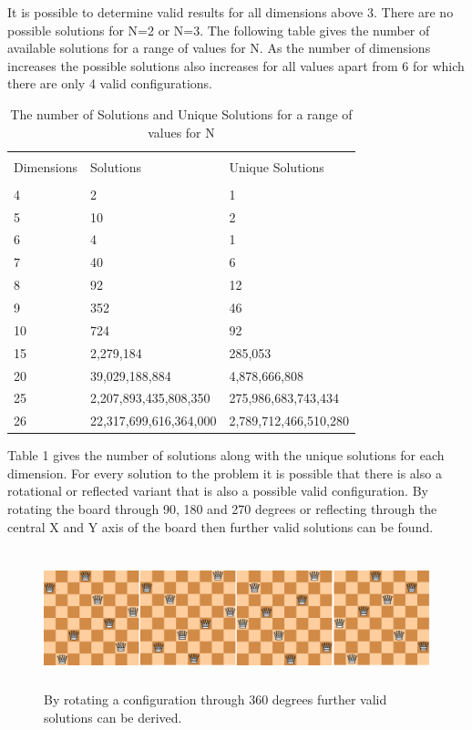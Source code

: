 \documentclass[a4paper,onecolumn,11pt]{article}
\begin{document}
It is possible to determine valid results for all dimensions above 3. There are no possible solutions for N=2 or N=3. The following table gives the number of available solutions for a range of values for N. As the number of dimensions increases the possible solutions also increases for all values apart from 6 for which there are only 4 valid configurations. 

\begin{table}[ht]
\begin{tabular}{|p{2cm}|p{6cm}|p{6cm}|} 
		\hline\\
		Dimensions & Solutions & Unique Solutions \\
		\hline\\
		4 & 2 & 1 \\ 
		5 & 10 & 2 \\
		6 & 4 & 1 \\
		7 & 40 & 6 \\
		8 & 92 & 12 \\
		9 & 352 & 46 \\
		10 & 724 & 92 \\
		15 & 2,279,184 & 285,053 \\
		20 & 39,029,188,884 & 4,878,666,808 \\
		25 & 2,207,893,435,808,350  & 275,986,683,743,434 \\
		26 & 22,317,699,616,364,000 & 2,789,712,466,510,280 \\
		\hline
	\end{tabular}
	\caption{The number of Solutions and Unique Solutions for a range of values for N}
\end{table}

Table 1 gives the number of solutions along with the unique solutions for each dimension. For every solution to the problem it is possible that there is also a rotational or reflected variant that is also a possible valid configuration. By rotating the board through 90, 180 and 270 degrees or reflecting through the central X and Y axis of the board then further valid solutions can be found.

\begin{figure}[!htbp]
	\centering	
	\includegraphics[width=16cm, height=4cm]{NQueensRotations}
	\caption{By rotating a configuration through 360 degrees further valid solutions can be derived.}
\end{figure}
\end{document}
